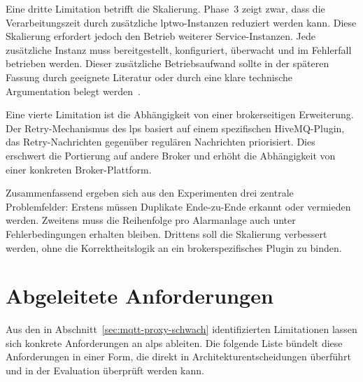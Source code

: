 Eine dritte Limitation betrifft die Skalierung. Phase~3 zeigt zwar, dass die Verarbeitungszeit durch zusätzliche \gls{lptwo}-Instanzen reduziert werden kann. Diese Skalierung erfordert jedoch den Betrieb weiterer Service-Instanzen. Jede zusätzliche Instanz muss bereitgestellt, konfiguriert, überwacht und im Fehlerfall betrieben werden. Dieser zusätzliche Betriebsaufwand sollte in der späteren Fassung durch geeignete Literatur oder durch eine klare technische Argumentation belegt werden~\citep{newman2021building}.

Eine vierte Limitation ist die Ab\-hän\-gig\-keit von einer brokerseitigen Erweiterung. Der Retry-Mechanismus des \gls{lps} basiert auf einem spezifischen HiveMQ-Plugin, das Retry-Nachrichten gegenüber regulären Nachrichten priorisiert. Dies erschwert die Portierung auf andere Broker und erhöht die Ab\-hän\-gig\-keit von einer konkreten Broker-Plattform.

Zusammenfassend ergeben sich aus den Experimenten drei zentrale Problemfelder: Erstens müssen Duplikate Ende-zu-Ende erkannt oder vermieden werden. Zweitens muss die Reihenfolge pro Alarmanlage auch unter Fehlerbedingungen erhalten bleiben. Drittens soll die Skalierung verbessert werden, ohne die Korrektheitslogik an ein brokerspezifisches Plugin zu binden.

\section{Abgeleitete Anforderungen}
\label{sec:requirements}
Aus den in Abschnitt~\ref{sec:mqtt-proxy-schwach} identifizierten Limitationen lassen sich konkrete Anforderungen an \gls{alps} ableiten. Die folgende Liste bündelt diese Anforderungen in einer Form, die direkt in Architekturentscheidungen überführt und in der Evaluation überprüft werden kann.

